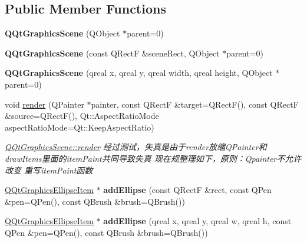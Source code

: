 \subsection*{Public Member Functions}
\begin{DoxyCompactItemize}
\item 
\mbox{\label{class_q_qt_graphics_scene_ac6dbb4d22279ebb1baf31d1af4a96e10}} 
{\bfseries Q\+Qt\+Graphics\+Scene} (Q\+Object $\ast$parent=0)
\item 
\mbox{\label{class_q_qt_graphics_scene_a66f2f662ca9a88ede5acdaa914d5c501}} 
{\bfseries Q\+Qt\+Graphics\+Scene} (const Q\+RectF \&scene\+Rect, Q\+Object $\ast$parent=0)
\item 
\mbox{\label{class_q_qt_graphics_scene_a25dd1361d6eac97445e358f38328fc2f}} 
{\bfseries Q\+Qt\+Graphics\+Scene} (qreal x, qreal y, qreal width, qreal height, Q\+Object $\ast$parent=0)
\item 
void \mbox{\hyperlink{class_q_qt_graphics_scene_a1744444e22949f5207050aaba010a0be}{render}} (Q\+Painter $\ast$painter, const Q\+RectF \&target=Q\+RectF(), const Q\+RectF \&source=Q\+RectF(), Qt\+::\+Aspect\+Ratio\+Mode aspect\+Ratio\+Mode=Qt\+::\+Keep\+Aspect\+Ratio)
\begin{DoxyCompactList}\small\item\em \mbox{\hyperlink{class_q_qt_graphics_scene_a1744444e22949f5207050aaba010a0be}{Q\+Qt\+Graphics\+Scene\+::render}} 经过测试，失真是由于render放缩\+Q\+Painter和draw\+Items里面的item\+Paint共同导致失真 现在规整理如下，原则：\+Qpainter不允许改变 重写item\+Paint函数 \end{DoxyCompactList}\item 
\mbox{\label{class_q_qt_graphics_scene_ad78214d619df10a6e87a0a0e675d4176}} 
\mbox{\hyperlink{class_q_qt_graphics_ellipse_item}{Q\+Qt\+Graphics\+Ellipse\+Item}} $\ast$ {\bfseries add\+Ellipse} (const Q\+RectF \&rect, const Q\+Pen \&pen=Q\+Pen(), const Q\+Brush \&brush=Q\+Brush())
\item 
\mbox{\label{class_q_qt_graphics_scene_a526c77b62dc368714503296e8182f00b}} 
\mbox{\hyperlink{class_q_qt_graphics_ellipse_item}{Q\+Qt\+Graphics\+Ellipse\+Item}} $\ast$ {\bfseries add\+Ellipse} (qreal x, qreal y, qreal w, qreal h, const Q\+Pen \&pen=Q\+Pen(), const Q\+Brush \&brush=Q\+Brush())

\end{DoxyCompactItemize}
